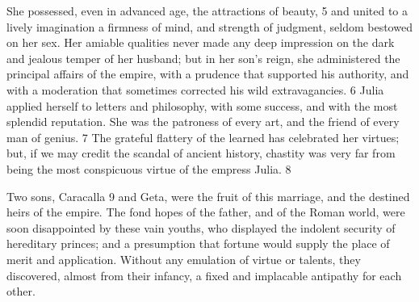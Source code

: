 She possessed, even in advanced age, the attractions of beauty, 5
and united to a lively imagination a firmness of mind, and
strength of judgment, seldom bestowed on her sex. Her amiable
qualities never made any deep impression on the dark and jealous
temper of her husband; but in her son’s reign, she administered
the principal affairs of the empire, with a prudence that
supported his authority, and with a moderation that sometimes
corrected his wild extravagancies. 6 Julia applied herself to
letters and philosophy, with some success, and with the most
splendid reputation. She was the patroness of every art, and the
friend of every man of genius. 7 The grateful flattery of the
learned has celebrated her virtues; but, if we may credit the
scandal of ancient history, chastity was very far from being the
most conspicuous virtue of the empress Julia. 8







Two sons, Caracalla 9 and Geta, were the fruit of this marriage,
and the destined heirs of the empire. The fond hopes of the
father, and of the Roman world, were soon disappointed by these
vain youths, who displayed the indolent security of hereditary
princes; and a presumption that fortune would supply the place of
merit and application. Without any emulation of virtue or
talents, they discovered, almost from their infancy, a fixed and
implacable antipathy for each other.


